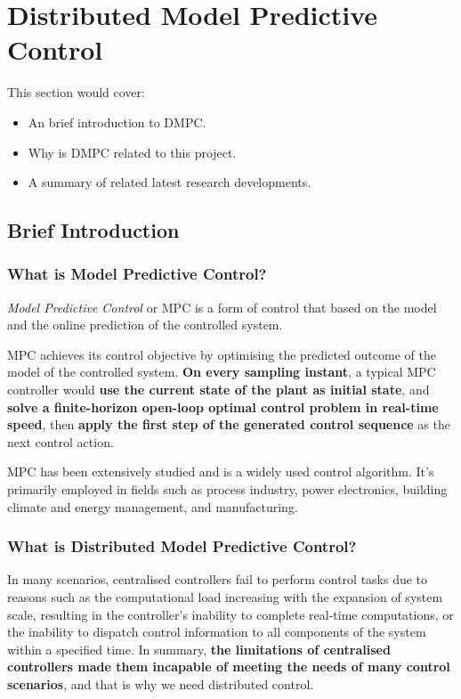 \section{Distributed Model Predictive Control}

This section would cover:
\begin{itemize}
  \item An brief introduction to DMPC.
  \item Why is DMPC related to this project.
  \item A summary of related latest research developments.
\end{itemize}

\subsection{Brief Introduction}
\subsubsection{What is Model Predictive Control\cite{MPC_Review1}?}

\textit{Model Predictive Control} or MPC is a form of control that based on the model and the online prediction of the controlled system.

MPC achieves its control objective by optimising the predicted outcome of the model of the controlled system\cite{MPC_Review1}.
\textbf{On every sampling instant}, a typical MPC controller would \textbf{use the current state of the plant as initial state}, and \textbf{solve a finite-horizon open-loop optimal control problem in real-time speed}, then \textbf{apply the first step of the generated control sequence} as the next control action.

MPC has been extensively studied and is a widely used control algorithm\cite{DMPC_Review1}. 
It's primarily employed in fields such as process industry, power electronics, building climate and energy management, and manufacturing\cite{MPC_Applications1, MPC_Applications2}.

\subsubsection{What is Distributed Model Predictive Control? \cite{DMPC_Review2}}



In many scenarios, centralised controllers fail to perform control tasks due to reasons such as the computational load increasing with the expansion of system scale, 
resulting in the controller's inability to complete real-time computations, 
or the inability to dispatch control information to all components of the system within a specified time. 
In summary, \textbf{the limitations of centralised controllers made them incapable of meeting the needs of many control scenarios}, and that is why we need distributed control.

